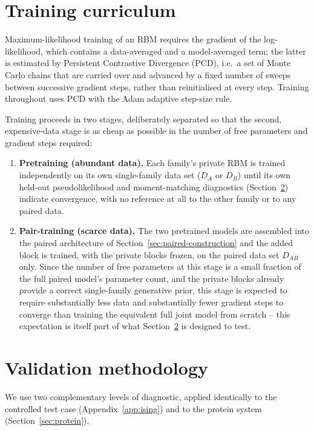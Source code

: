 \documentclass[11pt]{article}
\newcommand{\DA}{D_A}
\newcommand{\DB}{D_B}
\newcommand{\DAB}{D_{AB}}
\begin{document}
\section{Training curriculum}
\label{sec:training}

Maximum-likelihood training of an RBM requires the gradient of the
log-likelihood, which contains a data-averaged and a model-averaged term;
the latter is estimated by Persistent Contrastive Divergence (PCD), i.e.\
a set of Monte Carlo chains that are carried over and advanced by a fixed
number of sweeps between successive gradient steps, rather than
reinitialised at every step. Training throughout uses PCD with the Adam
adaptive step-size rule.

Training proceeds in two stages, deliberately separated so that the
second, expensive-data stage is as cheap as possible in the number of
free parameters and gradient steps required:

\begin{enumerate}
\item \textbf{Pretraining (abundant data).} Each family's private RBM is
trained independently on its own single-family data set ($\DA$ or $\DB$)
until its own held-out pseudolikelihood and moment-matching diagnostics
(Section~\ref{sec:validation}) indicate convergence, with no reference at
all to the other family or to any paired data.
\item \textbf{Pair-training (scarce data).} The two pretrained models are
assembled into the paired architecture of
Section~\ref{sec:paired-construction} and the added block is trained,
with the private blocks frozen, on the paired data set $\DAB$ only. Since
the number of free parameters at this stage is a small fraction of the
full paired model's parameter count, and the private blocks already
provide a correct single-family generative prior, this stage is expected
to require substantially less data and substantially fewer gradient steps
to converge than training the equivalent full joint model from scratch --
this expectation is itself part of what Section~\ref{sec:validation} is
designed to test.
\end{enumerate}

\section{Validation methodology}
\label{sec:validation}

We use two complementary levels of diagnostic, applied identically to the
controlled test case (Appendix~\ref{app:ising}) and to the protein system
(Section~\ref{sec:protein}).
\end{document}
